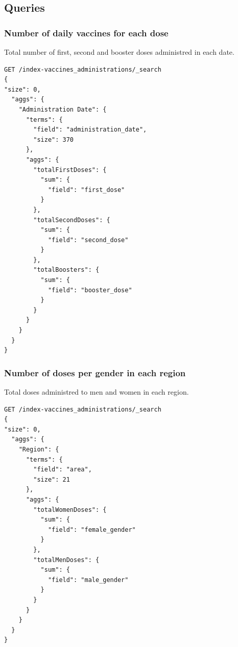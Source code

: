 \documentclass[12pt, a4paper]{article}
\begin{document}
\subsection{Queries}

\subsubsection{Number of daily vaccines for each dose}
Total number of first, second and booster doses administred in each date.
\begin{tcolorbox}[fontupper=\scriptsize]
    \begin{verbatim}
GET /index-vaccines_administrations/_search
{
"size": 0, 
  "aggs": {
    "Administration Date": {
      "terms": {
        "field": "administration_date",
        "size": 370
      },
      "aggs": {
        "totalFirstDoses": {
          "sum": {
            "field": "first_dose"
          }
        },        
        "totalSecondDoses": {
          "sum": {
            "field": "second_dose"
          }
        },        
        "totalBoosters": {
          "sum": {
            "field": "booster_dose"
          }
        }
      }
    }
  } 
}

    \end{verbatim}
\end{tcolorbox}

\noindent
\blindtext

\subsubsection{Number of doses per gender in each region}
Total doses administred to men and women in each region. 
\begin{tcolorbox}[fontupper=\scriptsize]
    \begin{verbatim}
GET /index-vaccines_administrations/_search
{
"size": 0, 
  "aggs": {
    "Region": {
      "terms": {
        "field": "area",
        "size": 21
      },
      "aggs": {
        "totalWomenDoses": {
          "sum": {
            "field": "female_gender"
          }
        },        
        "totalMenDoses": {
          "sum": {
            "field": "male_gender"
          }
        }
      }
    }
  } 
}

    \end{verbatim}
\end{tcolorbox}

\noindent
\blindtext
\end{document}
